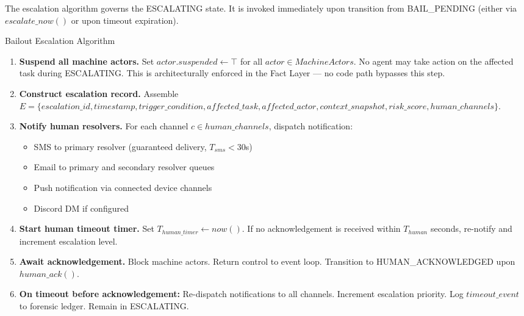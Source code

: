 The escalation algorithm governs the ESCALATING state. It is invoked immediately upon transition from BAIL\_PENDING (either via $escalate\_now()$ or upon timeout expiration).

\begin{algorithm}
\caption{Bailout Escalation Algorithm}
\label{alg:escalation}
\begin{enumerate}
  \item \textbf{Suspend all machine actors.} Set $actor.suspended \leftarrow \top$ for all $actor \in MachineActors$. No agent may take action on the affected task during ESCALATING. This is architecturally enforced in the Fact Layer --- no code path bypasses this step.

  \item \textbf{Construct escalation record.} Assemble $E = \{escalation\_id, timestamp, trigger\_condition, affected\_task, affected\_actor, context\_snapshot, risk\_score, human\_channels\}$.

  \item \textbf{Notify human resolvers.} For each channel $c \in human\_channels$, dispatch notification:
  \begin{itemize}
    \itemsep0em
    \item SMS to primary resolver (guaranteed delivery, $T_{sms} < 30$s)
    \item Email to primary and secondary resolver queues
    \item Push notification via connected device channels
    \item Discord DM if configured
  \end{itemize}

  \item \textbf{Start human timeout timer.} Set $T_{human\_timer} \leftarrow now()$. If no acknowledgement is received within $T_{human}$ seconds, re-notify and increment escalation level.

  \item \textbf{Await acknowledgement.} Block machine actors. Return control to event loop. Transition to HUMAN\_ACKNOWLEDGED upon $human\_ack()$.

  \item \textbf{On timeout before acknowledgement:} Re-dispatch notifications to all channels. Increment escalation priority. Log $timeout\_event$ to forensic ledger. Remain in ESCALATING.
\end{enumerate}
\end{algorithm}

